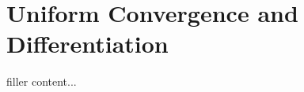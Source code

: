 \documentclass[../../templates/section]{subfiles}
\begin{document}
\section{Uniform Convergence and Differentiation}\label{sec:uniform-convergence-and-differentiation}

filler content...
\end{document}
